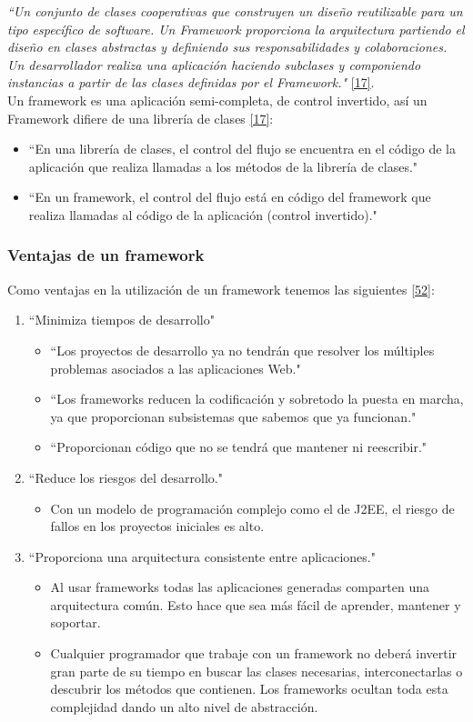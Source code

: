 \textit {``Un conjunto de clases cooperativas que construyen un diseño reutilizable para un tipo específico de software. Un Framework proporciona la arquitectura partiendo el diseño en clases abstractas y definiendo sus responsabilidades y colaboraciones. Un desarrollador realiza una aplicación haciendo subclases y componiendo instancias a partir de las clases definidas por el Framework."} \hyperlink{b17}{[17]}. \\

Un framework es una aplicación semi-completa, de control invertido, así un Framework difiere de una librería de clases \hyperlink{b17}{[17]}: 
\begin{itemize}
	\item ``En una librería de clases, el control del flujo se encuentra en el código de la aplicación que realiza llamadas a los métodos de la librería de clases."
	\item ``En un framework, el control del flujo está en código del framework que realiza llamadas al código de la aplicación (control invertido)."
\end{itemize}
\subsubsection {Ventajas de un framework}
Como ventajas en la utilización de un framework tenemos las siguientes \hyperlink{b52}{[52]}: 

\begin{enumerate}
	\item ``Minimiza tiempos de desarrollo"
	\begin{itemize}
	\item ``Los proyectos de desarrollo ya no tendrán que resolver los múltiples problemas asociados a las aplicaciones Web."
	\item ``Los frameworks reducen la codificación y sobretodo la puesta en marcha, ya que proporcionan subsistemas que sabemos que ya funcionan."
	\item ``Proporcionan código que no se tendrá que mantener ni reescribir."
	\end{itemize}
	\item ``Reduce los riesgos del desarrollo."
	\begin{itemize}
		\item Con un modelo de programación complejo como el de J2EE, el riesgo de fallos en los proyectos iniciales es alto.
	\end{itemize}
	\item ``Proporciona una arquitectura consistente entre aplicaciones."
	\begin{itemize}
		\item Al usar frameworks todas las aplicaciones generadas comparten una arquitectura común. Esto hace que sea más fácil de aprender, mantener y soportar.
		\item Cualquier programador que trabaje con un framework no deberá invertir gran parte de su tiempo en buscar las clases necesarias, interconectarlas o descubrir los métodos que contienen. Los frameworks ocultan toda esta complejidad dando un alto nivel de abstracción. 
	\end{itemize}
\end{enumerate}

